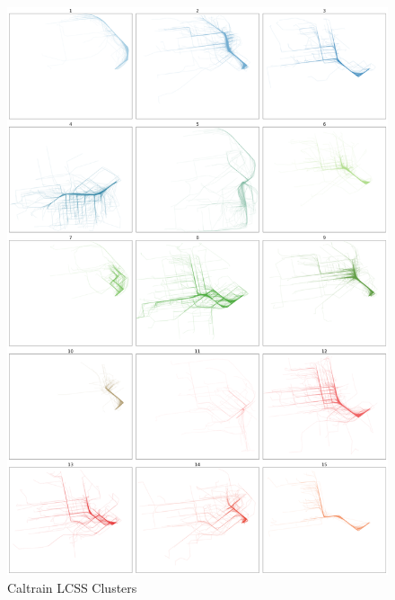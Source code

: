 \documentclass[a4paper, 12pt]{article}
\begin{document}
\begin{figure}[htbp!]
    \centering
    \includegraphics[width=1\textwidth]{Caltrain LCSS.png}
    \caption{Caltrain LCSS Clusters}
    \label{fig37}
\end{figure}
\end{document}
